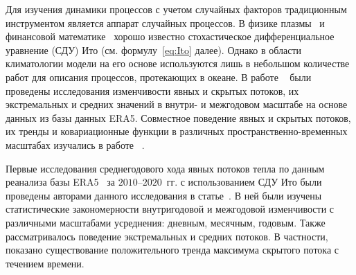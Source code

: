 Для изучения динамики процессов с учетом случайных факторов традиционным инструментом является аппарат случайных процессов. В физике плазмы~\cite{Espinos2018,Sexty2019} и финансовой математике~\cite{Bouchaud1998} хорошо известно стохастическое дифференциальное уравнение (СДУ) Ито (см. формулу~\eqref{eq:Ito} далее). Однако в области климатологии модели на его основе используются лишь в небольшом количестве работ для описания процессов, протекающих в океане. В работе ~\cite{van2021characterisation} были проведены исследования изменчивости явных и скрытых потоков, их экстремальных и средних значений в внутри- и межгодовом масштабе на основе данных из базы данных ERA5. Совместное поведение явных и скрытых потоков, их тренды и ковариационные функции в различных пространственно-временных масштабах изучались в работе ~\cite{toppaladoddi2021stochastic}. 

Первые исследования среднегодового хода явных потоков тепла по данным реанализа базы ERA5~\cite{hersbach2020era5} за $2010$--$2020$~гг. с использованием СДУ Ито были проведены авторами данного исследования в статье~\cite{2021_SOME_FEATURES}. В ней были изучены статистические закономерности внутригодовой и межгодовой изменчивости с различными масштабами усреднения: дневным, месячным, годовым. Также рассматривалось поведение экстремальных и средних потоков. В частности, показано существование положительного тренда максимума скрытого потока с течением времени. 

